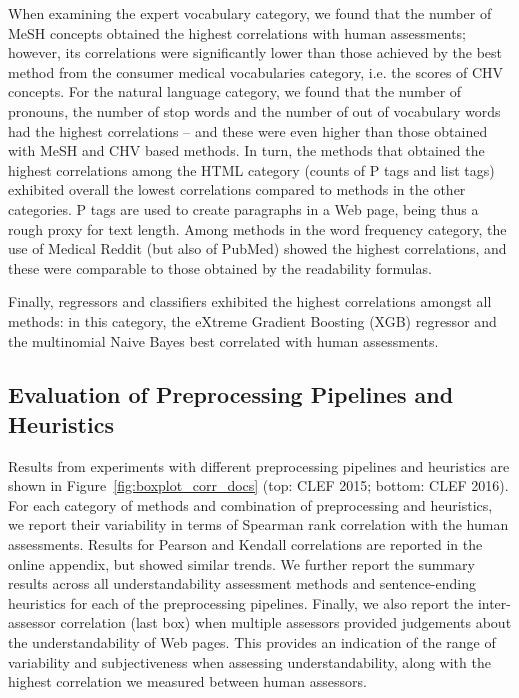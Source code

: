 When examining the expert vocabulary category, we found that the number of MeSH concepts obtained the highest correlations with human assessments; however, its correlations were significantly lower than those achieved by the best method from the consumer medical vocabularies category, i.e. the scores of CHV concepts. For the natural language category, we found that the number of pronouns, the number of stop words and the number of out of vocabulary words had the highest correlations -- and these were even higher than those obtained with MeSH and CHV based methods. In turn, the methods that obtained the highest correlations among the HTML category (counts of P tags and list tags) exhibited overall the lowest correlations compared to methods in the other categories. P tags are used to create paragraphs in a Web page, being thus a rough proxy for text length. 
Among methods in the word frequency category, the use of Medical Reddit (but also of PubMed) showed the highest correlations, and these were comparable to those obtained by the readability formulas. 

Finally, regressors and classifiers exhibited the highest correlations amongst all methods: in this  category, the  eXtreme Gradient Boosting (XGB) regressor and the multinomial Naive Bayes best correlated with human assessments. 

\subsection*{Evaluation of Preprocessing Pipelines and Heuristics}
\label{sec:which_preprocessing}

Results from experiments with different preprocessing pipelines and heuristics are shown in Figure~\ref{fig:boxplot_corr_docs} (top: CLEF 2015; bottom: CLEF 2016). 
For each category of methods and combination of preprocessing and heuristics, we report their variability in terms of Spearman rank correlation with the human assessments. Results for Pearson and Kendall correlations are reported in the online appendix, but showed similar trends. 
We further report the summary results across all understandability assessment methods and sentence-ending heuristics for each of the preprocessing pipelines. 
Finally, we also report the inter-assessor correlation (last box) when multiple assessors provided judgements about the understandability of Web pages. %
This provides an indication of the range of variability and subjectiveness when assessing understandability, along with the highest correlation we measured between human assessors. 

